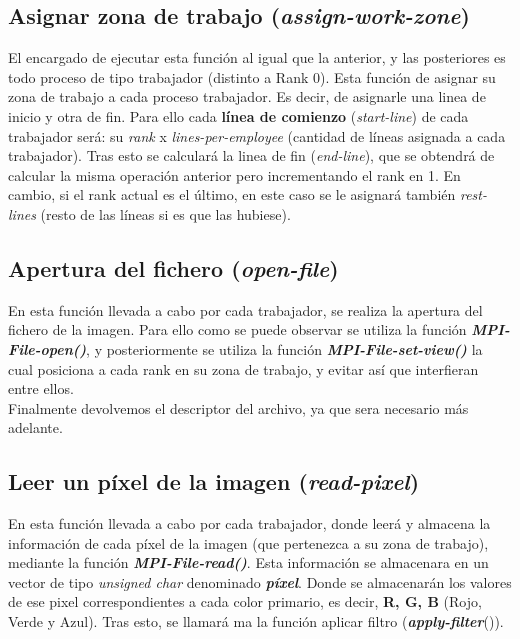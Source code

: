 \documentclass[11pt]{article}
\begin{document}



\subsection{Asignar zona de trabajo (\textit{assign-work-zone})}
El encargado de ejecutar esta función al igual que la anterior, y las posteriores es todo proceso de tipo trabajador (distinto a Rank 0). Esta función de asignar su zona de trabajo a cada proceso trabajador. Es decir, de asignarle una linea de inicio y otra de fin. Para ello cada \textbf{línea de comienzo} (\textit{start-line}) de cada trabajador será: su \textit{rank} x \textit{lines-per-employee} (cantidad de líneas asignada a cada trabajador). Tras esto se calculará la linea de fin (\textit{end-line}), que se obtendrá de calcular la misma operación anterior pero incrementando el rank en 1. En cambio, si el rank actual es el último, en este caso se le asignará también \textit{rest-lines} (resto de las líneas si es que las hubiese).




\subsection{Apertura del fichero (\textit{open-file})}
En esta función llevada a cabo por cada trabajador, se realiza la apertura del fichero de la imagen. Para ello como se puede observar se utiliza la función \textit{\textbf{MPI-File-open()}}, y posteriormente se utiliza la función \textbf{\textit{MPI-File-set-view()}} la cual posiciona a cada rank en su zona de trabajo, y evitar así que interfieran entre ellos.\\
Finalmente devolvemos el descriptor del archivo, ya que sera necesario más adelante. 




\subsection{Leer un píxel de la imagen (\textit{read-pixel})}
En esta función llevada a cabo por cada trabajador, donde leerá y almacena la información de cada píxel de la imagen (que pertenezca a su zona de trabajo), mediante la función \textit{\textbf{MPI-File-read()}}. Esta información se almacenara en un vector de tipo \textit{unsigned char} denominado \textit{\textbf{píxel}}. Donde se almacenarán los valores de ese pixel correspondientes a cada color primario, es decir, \textbf{R, G, B} (Rojo, Verde y Azul).
Tras esto, se llamará ma la función aplicar filtro (\textbf{\textit{apply-filter}}()).
\end{document}
